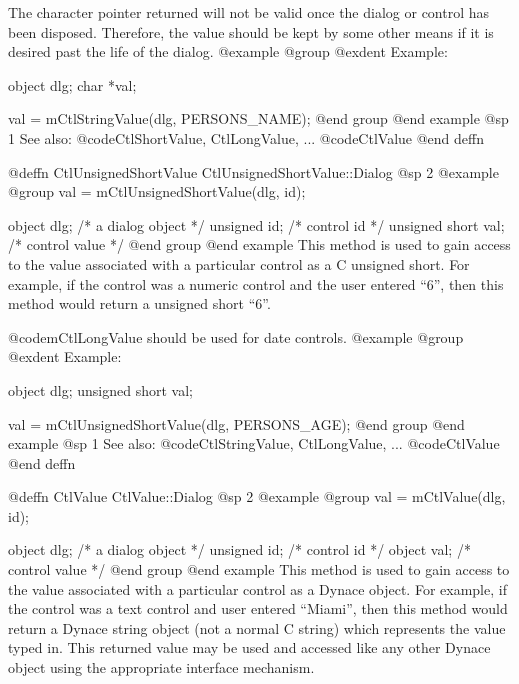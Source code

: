 The character pointer returned will not be valid once the dialog or
control has been disposed.  Therefore, the value should be kept by
some other means if it is desired past the life of the dialog.
@example
@group
@exdent Example:

object  dlg;
char    *val;

val = mCtlStringValue(dlg, PERSONS_NAME);
@end group
@end example
@sp 1
See also:  @code{CtlShortValue, CtlLongValue, ...}
        @code{CtlValue}
@end deffn











@deffn {CtlUnsignedShortValue} CtlUnsignedShortValue::Dialog
@sp 2
@example
@group
val = mCtlUnsignedShortValue(dlg, id);

object  dlg;    /*  a dialog object  */
unsigned id;    /*  control id       */
unsigned short  val;    /*  control value    */
@end group
@end example
This method is used to gain access to the value associated with a
particular control as a C unsigned short.  For example, if the control
was a numeric control and the user entered ``6'', then this method
would return a unsigned short ``6''.

@code{mCtlLongValue} should be used for date controls.
@example
@group
@exdent Example:

object  dlg;
unsigned short  val;

val = mCtlUnsignedShortValue(dlg, PERSONS_AGE);
@end group
@end example
@sp 1
See also:  @code{CtlStringValue, CtlLongValue, ...}
        @code{CtlValue}
@end deffn














@deffn {CtlValue} CtlValue::Dialog
@sp 2
@example
@group
val = mCtlValue(dlg, id);

object  dlg;    /*  a dialog object  */
unsigned id;    /*  control id       */
object  val;    /*  control value    */
@end group
@end example
This method is used to gain access to the value associated with a
particular control as a Dynace object.  For example, if the control
was a text control and user entered ``Miami'', then this method
would return a Dynace string object (not a normal C string) which
represents the value typed in.  This returned value may be used
and accessed like any other Dynace object using the appropriate
interface mechanism.

